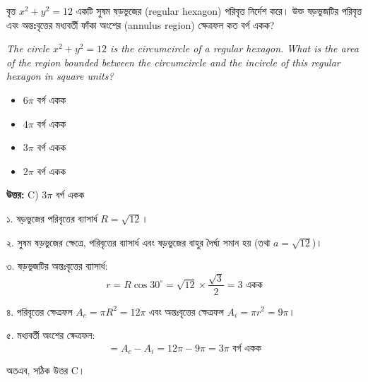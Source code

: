 \documentclass[12pt, a4paper]{article}
\begin{document}
\begin{tcolorbox}[questionbox={প্রশ্ন (Question) 48}]
    \noindent
    বৃত্ত $x^2 + y^2 = 12$ একটি সুষম ষড়ভুজের (regular hexagon) পরিবৃত্ত নির্দেশ করে। উক্ত ষড়ভুজটির পরিবৃত্ত এবং অন্তঃবৃত্তের মধ্যবর্তী ফাঁকা অংশের (annulus region) ক্ষেত্রফল কত বর্গ একক?
    
    \vspace{0.8em}
    \begin{english}
    \noindent\textit{\color{darkgray}
    The circle $x^2 + y^2 = 12$ is the circumcircle of a regular hexagon. What is the area of the region bounded between the circumcircle and the incircle of this regular hexagon in square units?
    }
    \end{english}
\end{tcolorbox}

\begin{itemize}[label={}, leftmargin=1cm, itemsep=0.5em]
    \item[\textbf{A)}] $6\pi$ বর্গ একক
    \item[\textbf{B)}] $4\pi$ বর্গ একক
    \item[\textbf{C)}] $3\pi$ বর্গ একক
    \item[\textbf{D)}] $2\pi$ বর্গ একক
\end{itemize}

\vspace{0.5em}
\begin{tcolorbox}[answerbox]
    \textbf{\color{success} উত্তর:} C) $3\pi$ বর্গ একক
\end{tcolorbox}
\vspace{1em}

\begin{tcolorbox}[solutionbox={সমাধান (Solution)}]
    \noindent
    ১. ষড়ভুজের পরিবৃত্তের ব্যাসার্ধ $R = \sqrt{12}$।
    
    \vspace{0.5em}
    ২. সুষম ষড়ভুজের ক্ষেত্রে, পরিবৃত্তের ব্যাসার্ধ এবং ষড়ভুজের বাহুর দৈর্ঘ্য সমান হয় (তথা $a = \sqrt{12}$)।
    
    \vspace{0.5em}
    ৩. ষড়ভুজটির অন্তঃবৃত্তের ব্যাসার্ধ: 
    \[ r = R \cos 30^{\circ} = \sqrt{12} \times \frac{\sqrt{3}}{2} = 3 \text{ একক} \]
    
    \vspace{0.5em}
    ৪. পরিবৃত্তের ক্ষেত্রফল $A_c = \pi R^2 = 12\pi$ এবং অন্তঃবৃত্তের ক্ষেত্রফল $A_i = \pi r^2 = 9\pi$।
    
    \vspace{0.5em}
    ৫. মধ্যবর্তী অংশের ক্ষেত্রফল:
    \[ = A_c - A_i = 12\pi - 9\pi = 3\pi \text{ বর্গ একক} \]
    
    \vspace{0.5em}
    অতএব, সঠিক উত্তর C।
\end{tcolorbox}
\end{document}
